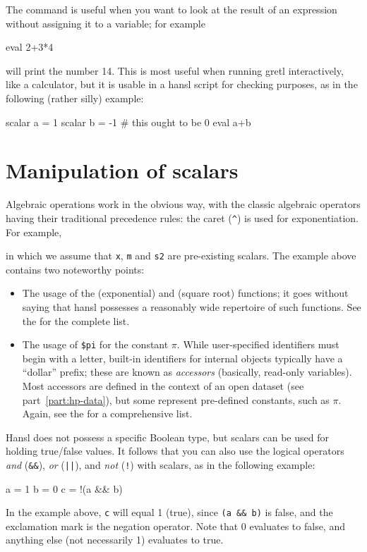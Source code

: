 
The  command is useful when you want to look at the result
of an expression without assigning it to a variable; for example
\begin{code}
  eval 2+3*4
\end{code}
will print the number 14. This is most useful when running gretl
interactively, like a calculator, but it is usable in a hansl script
for checking purposes, as in the following (rather silly) example:
\begin{code}
  scalar a = 1
  scalar b = -1
  # this ought to be 0
  eval a+b
\end{code}

\section{Manipulation of scalars}

Algebraic operations work in the obvious way, with the classic
algebraic operators having their traditional precedence rules: the
caret (\verb|^|) is used for exponentiation. For example,
in which we assume that \texttt{x}, \texttt{m} and \texttt{s2} are
pre-existing scalars. The example above contains two noteworthy
points:
\begin{itemize}
\item The usage of the  (exponential) and  (square
  root) functions; it goes without saying that hansl possesses a
  reasonably wide repertoire of such functions. See the \GCR{} for the
  complete list.
\item The usage of \verb|$pi| for the constant $\pi$. While
  user-specified identifiers must begin with a letter, built-in
  identifiers for internal objects typically have a ``dollar'' prefix;
  these are known as \emph{accessors} (basically, read-only
  variables).  Most accessors are defined in the context of an open
  dataset (see part~\ref{part:hp-data}), but some represent
  pre-defined constants, such as $\pi$. Again, see the \GCR{} for a
  comprehensive list.
\end{itemize}

Hansl does not possess a specific Boolean type, but scalars can be
used for holding true/false values. It follows that you can also use
the logical operators \emph{and} (\verb|&&|), \emph{or} (\verb+||+),
and \emph{not} (\verb|!|) with scalars, as in the following example:
\begin{code}
  a = 1
  b = 0
  c = !(a && b) 
\end{code}
In the example above, \texttt{c} will equal 1 (true), since
\verb|(a && b)| is false, and the exclamation mark is the negation
operator.  Note that 0 evaluates to false, and anything else (not
necessarily 1) evaluates to true.

